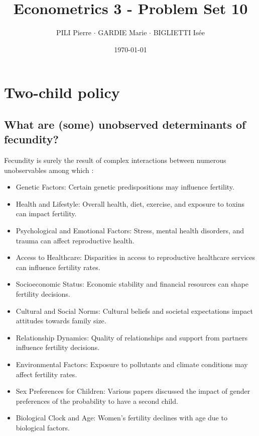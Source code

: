 \documentclass[12pt]{article}
\title{Econometrics 3 - Problem Set 10}
\author{PILI Pierre $\cdot$ GARDIE Marie $\cdot$ BIGLIETTI Isée}
\date{\today}
\begin{document}
\maketitle

\section{Two-child policy}
\subsection{What are (some) unobserved determinants of fecundity?}
Fecundity is surely the result of complex interactions between numerous unobservables among which :
\begin{itemize}
    \item Genetic Factors: Certain genetic predispositions may influence fertility.
    
    \item Health and Lifestyle: Overall health, diet, exercise, and exposure to toxins can impact fertility.
    
    \item Psychological and Emotional Factors: Stress, mental health disorders, and trauma can affect reproductive health.
    
    \item Access to Healthcare: Disparities in access to reproductive healthcare services can influence fertility rates.
    
    \item Socioeconomic Status: Economic stability and financial resources can shape fertility decisions.
    
    \item Cultural and Social Norms: Cultural beliefs and societal expectations impact attitudes towards family size.
    
    \item Relationship Dynamics: Quality of relationships and support from partners influence fertility decisions.
    
    \item Environmental Factors: Exposure to pollutants and climate conditions may affect fertility rates.

    \item Sex Preferences for Children: Various papers discussed the impact of gender preferences of the probability to have a second child.
    
    \item Biological Clock and Age: Women's fertility declines with age due to biological factors.
\end{itemize}
\end{document}
